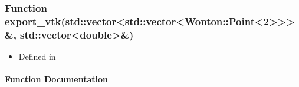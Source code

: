 \documentclass[letterpaper,10pt,english]{sphinxmanual}
\begin{document}
\sphinxstepscope


\subsubsection{Function export\_vtk(std::vector\textless{}std::vector\textless{}Wonton::Point\textless{}2\textgreater{}\textgreater{}\textgreater{}\&, std::vector\textless{}double\textgreater{}\&)}
\label{\detokenize{api/function_test_8h_1a8e46f0017f81a6712bd99c4a9ca87602:function-export-vtk-std-vector-std-vector-wonton-point-2-std-vector-double}}\label{\detokenize{api/function_test_8h_1a8e46f0017f81a6712bd99c4a9ca87602:exhale-function-test-8h-1a8e46f0017f81a6712bd99c4a9ca87602}}\label{\detokenize{api/function_test_8h_1a8e46f0017f81a6712bd99c4a9ca87602::doc}}\begin{itemize}
\item {} 
\sphinxAtStartPar
Defined in 

\end{itemize}


\paragraph{Function Documentation}
\label{\detokenize{api/function_test_8h_1a8e46f0017f81a6712bd99c4a9ca87602:function-documentation}}

\begin{fulllineitems}
\label{\detokenize{api/function_test_8h_1a8e46f0017f81a6712bd99c4a9ca87602:_CPPv410export_vtkRNSt6vectorINSt6vectorIN6Wonton5PointIXL2EEEEEEEERNSt6vectorIdEE}}
\pysigstartsignatures
\pysigstartmultiline
{}
\pysigstopmultiline
\pysigstopsignatures
\end{fulllineitems}
\end{document}
